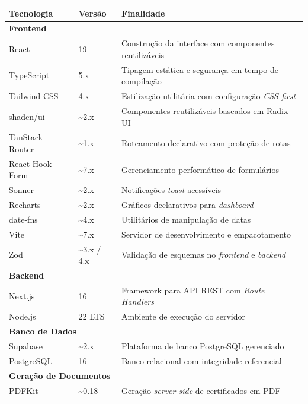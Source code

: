 \vspace{-0.5em}
\begin{quadro}[H]
\centering
\small
\caption{Tecnologias utilizadas no desenvolvimento do sistema}
\label{qua:tecnologias}
\begin{tabular}{@{}lll@{}}
\toprule
\textbf{Tecnologia} & \textbf{Versão} & \textbf{Finalidade} \\
\midrule
\multicolumn{3}{l}{\textbf{Frontend}} \\
React & 19 & Construção da interface com componentes reutilizáveis \\
TypeScript & 5.x & Tipagem estática e segurança em tempo de compilação \\
Tailwind CSS & 4.x & Estilização utilitária com configuração \textit{CSS-first} \\
shadcn/ui & \textasciitilde 2.x & Componentes reutilizáveis baseados em Radix UI \\
TanStack Router & \textasciitilde 1.x & Roteamento declarativo com proteção de rotas \\
React Hook Form & \textasciitilde 7.x & Gerenciamento performático de formulários \\
Sonner & \textasciitilde 2.x & Notificações \textit{toast} acessíveis \\
Recharts & \textasciitilde 2.x & Gráficos declarativos para \textit{dashboard} \\
date-fns & \textasciitilde 4.x & Utilitários de manipulação de datas \\
Vite & \textasciitilde 7.x & Servidor de desenvolvimento e empacotamento \\
Zod & \textasciitilde 3.x / 4.x & Validação de esquemas no \textit{frontend} e \textit{backend} \\
\midrule
\multicolumn{3}{l}{\textbf{Backend}} \\
Next.js & 16 & Framework para API REST com \textit{Route Handlers} \\
Node.js & 22 LTS & Ambiente de execução do servidor \\
\midrule
\multicolumn{3}{l}{\textbf{Banco de Dados}} \\
Supabase & \textasciitilde 2.x & Plataforma de banco PostgreSQL gerenciado \\
PostgreSQL & 16 & Banco relacional com integridade referencial \\
\midrule
\multicolumn{3}{l}{\textbf{Geração de Documentos}} \\
PDFKit & \textasciitilde 0.18 & Geração \textit{server-side} de certificados em PDF \\

\end{tabular}
\end{quadro}
